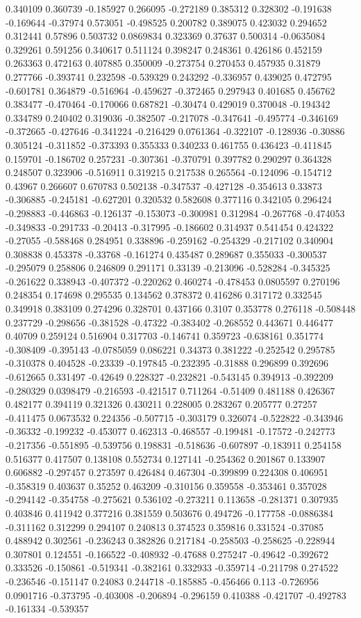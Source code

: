 0.340109 0.360739 -0.185927 0.266095 -0.272189 0.385312 0.328302 -0.191638 -0.169644 -0.37974 0.573051 -0.498525 0.200782 0.389075 0.423032 0.294652 0.312441 0.57896 0.503732 0.0869834 0.323369 0.37637 0.500314 -0.0635084 0.329261 0.591256 0.340617 0.511124 0.398247 0.248361 0.426186 0.452159 0.263363 0.472163 0.407885 0.350009 -0.273754 0.270453 0.457935 0.31879 0.277766 -0.393741 0.232598 -0.539329 0.243292 -0.336957 0.439025 0.472795 -0.601781 0.364879 -0.516964 -0.459627 -0.372465 0.297943 0.401685 0.456762 0.383477 -0.470464 -0.170066 0.687821 -0.30474 0.429019 0.370048 -0.194342 0.334789 0.240402 0.319036 -0.382507 -0.217078 -0.347641 -0.495774 -0.346169 -0.372665 -0.427646 -0.341224 -0.216429 0.0761364 -0.322107 -0.128936 -0.30886 0.305124 -0.311852 -0.373393 0.355333 0.340233 0.461755 0.436423 -0.411845 0.159701 -0.186702 0.257231 -0.307361 -0.370791 0.397782 0.290297 0.364328 0.248507 0.323906 -0.516911 0.319215 0.217538 0.265564 -0.124096 -0.154712 0.43967 0.266607 0.670783 0.502138 -0.347537 -0.427128 -0.354613 0.33873 -0.306885 -0.245181 -0.627201 0.320532 0.582608 0.377116 0.342105 0.296424 -0.298883 -0.446863 -0.126137 -0.153073 -0.300981 0.312984 -0.267768 -0.474053 -0.349833 -0.291733 -0.20413 -0.317995 -0.186602 0.314937 0.541454 0.424322 -0.27055 -0.588468 0.284951 0.338896 -0.259162 -0.254329 -0.217102 0.340904 0.308838 0.453378 -0.33768 -0.161274 0.435487 0.289687 0.355033 -0.300537 -0.295079 0.258806 0.246809 0.291171 0.33139 -0.213096 -0.528284 -0.345325 -0.261622 0.338943 -0.407372 -0.220262 0.460274 -0.478453 0.0805597 0.270196 0.248354 0.174698 0.295535 0.134562 0.378372 0.416286 0.317172 0.332545 0.349918 0.383109 0.274296 0.328701 0.437166 0.3107 0.353778 0.276118 -0.508448 0.237729 -0.298656 -0.381528 -0.47322 -0.383402 -0.268552 0.443671 0.446477 0.40709 0.259124 0.516904 0.317703 -0.146741 0.359723 -0.638161 0.351774 -0.308409 -0.395143 -0.0785059 0.086221 0.34373 0.381222 -0.252542 0.295785 -0.310378 0.404528 -0.23339 -0.197845 -0.232395 -0.31888 0.296899 0.392696 -0.612665 0.331497 -0.42649 0.228327 -0.232821 -0.543145 0.394913 -0.392209 -0.280329 0.0398479 -0.216593 -0.421517 0.711264 -0.51409 0.481188 0.426367 0.482177 0.394119 0.321326 0.430211 0.228005 0.283267 0.205777 0.27257 -0.411475 0.0673532 0.224356 -0.507715 -0.303179 0.326074 -0.522822 -0.343946 -0.36332 -0.199232 -0.453077 0.462313 -0.468557 -0.199481 -0.17572 -0.242773 -0.217356 -0.551895 -0.539756 0.198831 -0.518636 -0.607897 -0.183911 0.254158 0.516377 0.417507 0.138108 0.552734 0.127141 -0.254362 0.201867 0.133907 0.606882 -0.297457 0.273597 0.426484 0.467304 -0.399899 0.224308 0.406951 -0.358319 0.403637 0.35252 0.463209 -0.310156 0.359558 -0.353461 0.357028 -0.294142 -0.354758 -0.275621 0.536102 -0.273211 0.113658 -0.281371 0.307935 0.403846 0.411942 0.377216 0.381559 0.503676 0.494726 -0.177758 -0.0886384 -0.311162 0.312299 0.294107 0.240813 0.374523 0.359816 0.331524 -0.37085 0.488942 0.302561 -0.236243 0.382826 0.217184 -0.258503 -0.258625 -0.228944 0.307801 0.124551 -0.166522 -0.408932 -0.47688 0.275247 -0.49642 -0.392672 0.333526 -0.150861 -0.519341 -0.382161 0.332933 -0.359714 -0.211798 0.274522 -0.236546 -0.151147 0.24083 0.244718 -0.185885 -0.456466 0.113 -0.726956 0.0901716 -0.373795 -0.403008 -0.206894 -0.296159 0.410388 -0.421707 -0.492783 -0.161334 -0.539357 